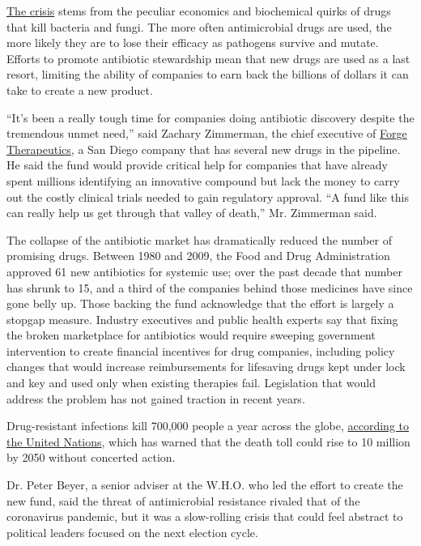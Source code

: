 \href{https://www.nytimes3xbfgragh.onion/2019/04/06/health/drug-resistant-candida-auris.html}{The
crisis} stems from the peculiar economics and biochemical quirks of
drugs that kill bacteria and fungi. The more often antimicrobial drugs
are used, the more likely they are to lose their efficacy as pathogens
survive and mutate. Efforts to promote antibiotic stewardship mean that
new drugs are used as a last resort, limiting the ability of companies
to earn back the billions of dollars it can take to create a new
product.

``It's been a really tough time for companies doing antibiotic discovery
despite the tremendous unmet need,'' said Zachary Zimmerman, the chief
executive of \href{https://forgetherapeutics.com/}{Forge Therapeutics},
a San Diego company that has several new drugs in the pipeline. He said
the fund would provide critical help for companies that have already
spent millions identifying an innovative compound but lack the money to
carry out the costly clinical trials needed to gain regulatory approval.
``A fund like this can really help us get through that valley of
death,'' Mr. Zimmerman said.

The collapse of the antibiotic market has dramatically reduced the
number of promising drugs. Between 1980 and 2009, the Food and Drug
Administration approved 61 new antibiotics for systemic use; over the
past decade that number has shrunk to 15, and a third of the companies
behind those medicines have since gone belly up. Those backing the fund
acknowledge that the effort is largely a stopgap measure. Industry
executives and public health experts say that fixing the broken
marketplace for antibiotics would require sweeping government
intervention to create financial incentives for drug companies,
including policy changes that would increase reimbursements for
lifesaving drugs kept under lock and key and used only when existing
therapies fail. Legislation that would address the problem has not
gained traction in recent years.

Drug-resistant infections kill 700,000 people a year across the globe,
\href{https://www.nytimes3xbfgragh.onion/2019/04/29/health/un-drug-resistance-antibiotics.html}{according
to the United Nations}, which has warned that the death toll could rise
to 10 million by 2050 without concerted action.

Dr. Peter Beyer, a senior adviser at the W.H.O. who led the effort to
create the new fund, said the threat of antimicrobial resistance rivaled
that of the coronavirus pandemic, but it was a slow-rolling crisis that
could feel abstract to political leaders focused on the next election
cycle.


